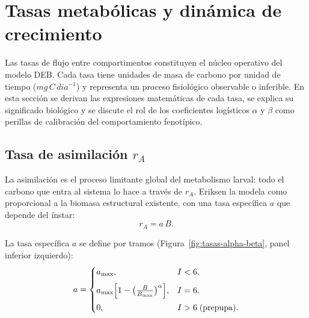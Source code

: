 
\section{Tasas metab\'{o}licas y din\'{a}mica de crecimiento}

Las tasas de flujo entre compartimentos constituyen el n\'{u}cleo operativo del modelo DEB. Cada tasa tiene unidades de masa de carbono por unidad de tiempo ($\si{mg\,C\,dia^{-1}}$) y representa un proceso fisiol\'{o}gico observable o inferible. En esta secci\'{o}n se derivan las expresiones matem\'{a}ticas de cada tasa, se explica su significado biol\'{o}gico y se discute el rol de los coeficientes log\'{i}sticos $\alpha$ y $\beta$ como perillas de calibraci\'{o}n del comportamiento fenot\'{i}pico.

\subsection{Tasa de asimilaci\'{o}n $r_A$}

La asimilaci\'{o}n es el proceso limitante global del metabolismo larval: todo el carbono que entra al sistema lo hace a trav\'{e}s de $r_A$. Eriksen la modela como proporcional a la biomasa estructural existente, con una tasa espec\'{i}fica $a$ que depende del \'{i}nstar:
\begin{equation}
    r_A = a\,B.
    \label{eq:rA}
\end{equation}

La tasa espec\'{i}fica $a$ se define por tramos (Figura~\ref{fig:tasas-alpha-beta}, panel inferior izquierdo):
\begin{equation}
    a =
    \begin{cases}
        a_{\max}, & I < 6, \\[6pt]
        a_{\max}\Bigl[1 - \bigl(\frac{B}{B_{\max}}\bigr)^{\alpha}\Bigr], & I = 6, \\[6pt]
        0, & I > 6 \;\text{(prepupa)}.
    \end{cases}
    \label{eq:a}
\end{equation}

